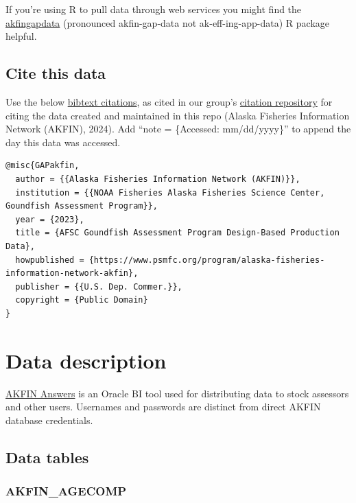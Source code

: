 \documentclass[
  letterpaper,
  oneside,
  open=any]{scrbook}
\begin{document}
If you're using R to pull data through web services you might find the
\href{https://github.com/MattCallahan-NOAA/akfingapdata/tree/main}{akfingapdata}
(pronounced akfin-gap-data not ak-eff-ing-app-data) R package helpful.

\hypertarget{cite-this-data-2}{%
\section*{Cite this data}\label{cite-this-data-2}}


Use the below
\href{https://github.com/afsc-gap-products/gap_products/blob/main/code/CITATION_GAPakfin.bib}{bibtext
citations}, as cited in our group's
\href{https://github.com/afsc-gap-products/citations/blob/main/cite/bibliography.bib}{citation
repository} for citing the data created and maintained in this repo
(Alaska Fisheries Information Network (AKFIN), 2024). Add ``note =
\{Accessed: mm/dd/yyyy\}'' to append the day this data was accessed.

\begin{verbatim}
@misc{GAPakfin,
  author = {{Alaska Fisheries Information Network (AKFIN)}}, 
  institution = {{NOAA Fisheries Alaska Fisheries Science Center, Goundfish Assessment Program}},
  year = {2023}, 
  title = {AFSC Goundfish Assessment Program Design-Based Production Data},
  howpublished = {https://www.psmfc.org/program/alaska-fisheries-information-network-akfin},
  publisher = {{U.S. Dep. Commer.}},
  copyright = {Public Domain} 
}
\end{verbatim}

\hypertarget{data-description-2}{%
\chapter{Data description}\label{data-description-2}}

\href{https://akfin.psmfc.org/akfin-answers/}{AKFIN Answers} is an
Oracle BI tool used for distributing data to stock assessors and other
users. Usernames and passwords are distinct from direct AKFIN database
credentials.

\hypertarget{data-tables-1}{%
\section{Data tables}\label{data-tables-1}}

\hypertarget{akfin_agecomp}{%
\subsection{AKFIN\_AGECOMP}\label{akfin_agecomp}}
\end{document}
